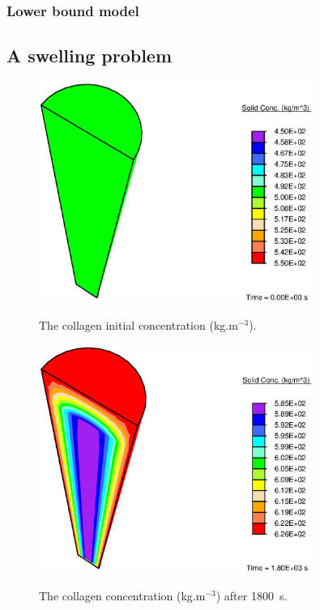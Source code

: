 \subsubsection{Lower bound model}
\label{lower-bound}

\subsection{A swelling problem}
\label{swelling-1}

\begin{figure}[!hpt]
  \centering
     {\includegraphics[width=0.8\textwidth]{images/examples/lagrangian/swelling/before-growth}}
     \caption{The collagen initial concentration (kg.m$^{-3}$).}
     \label{before_growth}
\end{figure}

\begin{figure}[!hpt]
  \centering
     {\includegraphics[width=0.8\textwidth]{images/examples/lagrangian/swelling/after-growth}}
     \caption{The collagen concentration (kg.m$^{-3}$) after 1800~s.}
     \label{after_growth}
\end{figure}


